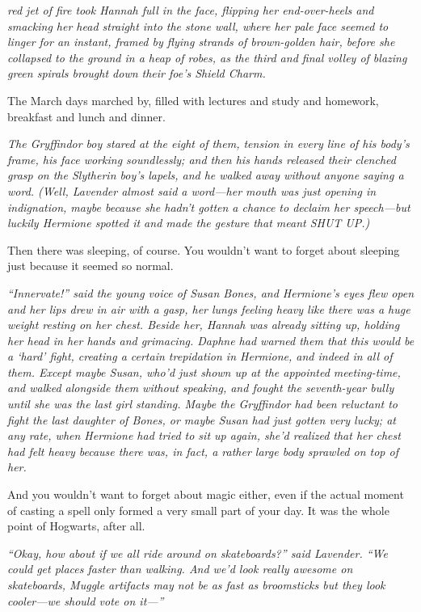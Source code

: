 
 \emph{red jet
of fire took Hannah full in the face, flipping her end-over-heels and smacking
her head straight into the stone wall, where her pale face seemed to linger for
an instant, framed by flying strands of brown-golden hair, before she collapsed
to the ground in a heap of robes, as the third and final volley of blazing
green spirals brought down their foe's Shield Charm.}

The March days marched by, filled with lectures and study and homework,
breakfast and lunch and dinner.

\emph{The Gryffindor boy stared at the eight of them, tension in every line of
his body's frame, his face working soundlessly; and then his hands released
their clenched grasp on the Slytherin boy's lapels, and he walked away without
anyone saying a word. (Well, Lavender almost said a word—her mouth was just
opening in indignation, maybe because she hadn't gotten a chance to declaim her
speech—but luckily Hermione spotted it and made the gesture that meant SHUT
UP.)}

Then there was sleeping, of course. You wouldn't want to forget about sleeping
just because it seemed so normal.

\emph{``Innervate!'' said the young voice of Susan Bones, and Hermione's eyes
flew open and her lips drew in air with a gasp, her lungs feeling heavy like
there was a huge weight resting on her chest. Beside her, Hannah was already
sitting up, holding her head in her hands and grimacing. Daphne had warned them
that this would be a `hard' fight, creating a certain trepidation in Hermione,
and indeed in all of them. Except maybe Susan, who'd just shown up at the
appointed meeting-time, and walked alongside them without speaking, and fought
the seventh-year bully until she was the last girl standing. Maybe the
Gryffindor had been reluctant to fight the last daughter of Bones, or maybe
Susan had just gotten very lucky; at any rate, when Hermione had tried to sit
up again, she'd realized that her chest had felt heavy because there was, in
fact, a rather large body sprawled on top of her.}

And you wouldn't want to forget about magic either, even if the actual moment
of casting a spell only formed a very small part of your day. It was the whole
point of Hogwarts, after all.

\emph{``Okay, how about if we all ride around on skateboards?'' said Lavender.
``We could get places faster than walking. And we'd look really awesome on
skateboards, Muggle artifacts may not be as fast as broomsticks but they look
cooler—we should vote on it—''}

